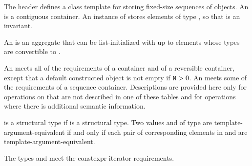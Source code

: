 \pnum
{}%
The header  defines a class template for storing fixed-size
sequences of objects.
An  is a contiguous container.
An instance of  stores  elements of type ,
so that  is an invariant.

\pnum
{}%
%
An  is an aggregate that can be
list-initialized with up
to  elements whose types are convertible to .

\pnum
{}%
An  meets all of the requirements
of a container and
of a reversible container,
except that a default
constructed  object is not empty if $\texttt{N} > 0$.
An  meets some of the requirements of a sequence
container.
Descriptions are provided here
only for operations on  that are not described in
one of these tables and
for operations where there is additional semantic information.

\pnum
{} is a structural type if
 is a structural type.
Two values  and  of type 
are template-argument-equivalent if and only if
each pair of corresponding elements in  and 
are template-argument-equivalent.

\pnum
The types  and  meet
the constexpr iterator requirements.

